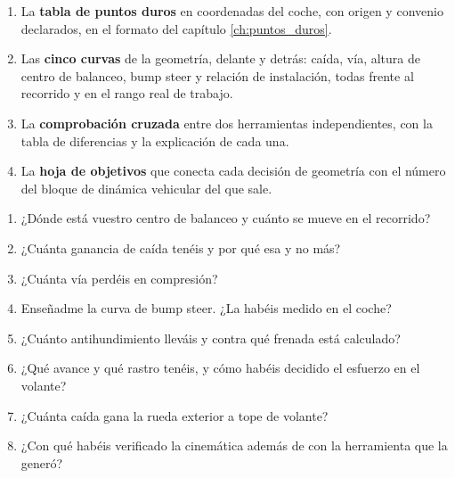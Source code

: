 \begin{entregable}
\begin{enumerate}
  \item La \textbf{tabla de puntos duros} en coordenadas del coche, con origen y
        convenio declarados, en el formato del capítulo \ref{ch:puntos_duros}.
  \item Las \textbf{cinco curvas} de la geometría, delante y detrás: caída, vía,
        altura de centro de balanceo, bump steer y relación de instalación,
        todas frente al recorrido y en el rango real de trabajo.
  \item La \textbf{comprobación cruzada} entre dos herramientas independientes,
        con la tabla de diferencias y la explicación de cada una.
  \item La \textbf{hoja de objetivos} que conecta cada decisión de geometría con
        el número del bloque de dinámica vehicular del que sale.
\end{enumerate}
\end{entregable}

\begin{juez}
\begin{enumerate}
  \item ¿Dónde está vuestro centro de balanceo y cuánto se mueve en el
        recorrido?
  \item ¿Cuánta ganancia de caída tenéis y por qué esa y no más?
  \item ¿Cuánta vía perdéis en compresión?
  \item Enseñadme la curva de bump steer. ¿La habéis medido en el coche?
  \item ¿Cuánto antihundimiento lleváis y contra qué frenada está calculado?
  \item ¿Qué avance y qué rastro tenéis, y cómo habéis decidido el esfuerzo en
        el volante?
  \item ¿Cuánta caída gana la rueda exterior a tope de volante?
  \item ¿Con qué habéis verificado la cinemática además de con la herramienta
        que la generó?
\end{enumerate}
\end{juez}
